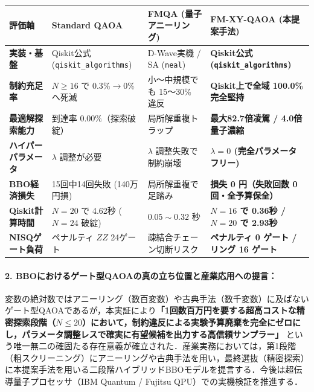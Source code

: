 \documentclass[11pt,a4paper]{ltjsarticle}
\begin{document}
\vspace{-1mm}
\begin{center}
\label{tab:final_summary}
\vspace{1mm}
\footnotesize
\begin{tabularx}{\textwidth}{l >{\raggedright\arraybackslash}p{3.8cm} >{\raggedright\arraybackslash}p{3.8cm} >{\raggedright\arraybackslash}X}
\toprule
\textbf{評価軸} & \textbf{Standard QAOA} & \textbf{FMQA (量子アニーリング)} & \textbf{FM-XY-QAOA (本提案手法)} \\
\midrule
\textbf{実装・基盤} & Qiskit公式 (\texttt{qiskit\_algorithms}) & D-Wave実機 / SA (\texttt{neal}) & \textbf{Qiskit公式 (\texttt{qiskit\_algorithms})} \\
\textbf{制約充足率} & $N \ge 16$ で $0.3\% \to 0\%$ へ死滅 & 小〜中規模でも 15〜30\% 違反 & \textbf{Qiskit上で全域 100.0\% 完全堅持} \\
\textbf{最適解探索能力} & 到達率 $0.00\%$（探索破綻） & 局所解重複トラップ & \textbf{最大82.7倍凌駕 / 4.0倍量子濃縮} \\
\textbf{ハイパーパラメータ} & $\lambda$ 調整が必要 & $\lambda$ 調整失敗で制約崩壊 & \textbf{$\lambda=0$ (完全パラメータフリー)} \\
\textbf{BBO経済損失} & 15回中14回失敗 (140万円損) & 局所解重複で足踏み & \textbf{損失 0 円（失敗回数 0 回・全予算保全）} \\
\textbf{Qiskit計算時間} & $N=20$ で 4.62秒 ($N=24$ 破綻) & $0.05 \sim 0.32$ 秒 & \textbf{$N=16$ で 0.36秒 / $N=20$ で 2.93秒} \\
\textbf{NISQゲート負荷} & ペナルティ $ZZ$ 24ゲート & 疎結合チェーン切断リスク & \textbf{ペナルティ 0 ゲート / リング 16 ゲート} \\
\bottomrule
\end{tabularx}
\end{center}

\vspace{-2mm}
\paragraph{2. BBOにおけるゲート型QAOAの真の立ち位置と産業応用への提言：}
変数の絶対数ではアニーリング（数百変数）や古典手法（数千変数）に及ばないゲート型QAOAであるが，本実証により\textbf{「1回数百万円を要する超高コストな精密探索段階（$N \le 20$）において，制約違反による実験予算廃棄を完全にゼロにし，パラメータ調整レスで確実に有望候補を出力する高信頼サンプラー」} という唯一無二の確固たる存在意義が確立された．産業実務においては，第1段階（粗スクリーニング）にアニーリングや古典手法を用い，最終選抜（精密探索）に本提案手法を用いる二段階ハイブリッドBBOモデルを提言する．今後は超伝導量子プロセッサ（IBM Quantum / Fujitsu QPU）での実機検証を推進する．
\end{document}
